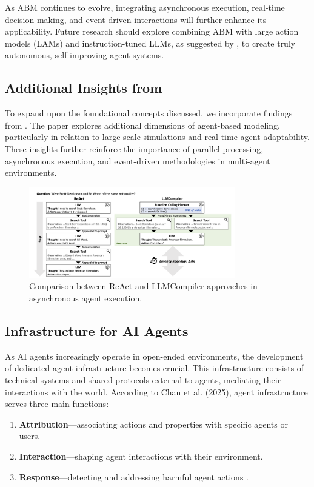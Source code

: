 As ABM continues to evolve, integrating asynchronous execution, real-time decision-making, and event-driven interactions will further enhance its applicability. Future research should explore combining ABM with large action models (LAMs) and instruction-tuned LLMs, as suggested by \cite{ginart2024}, to create truly autonomous, self-improving agent systems.

\subsection{Additional Insights from \cite{ginart2024}}

To expand upon the foundational concepts discussed, we incorporate findings from \cite{ginart2024}. The paper explores additional dimensions of agent-based modeling, particularly in relation to large-scale simulations and real-time agent adaptability. These insights further reinforce the importance of parallel processing, asynchronous execution, and event-driven methodologies in multi-agent environments.

\begin{figure}[h!]
\centering
\includegraphics[width=0.8\textwidth]{Assets/agent-architecture.png}
\caption{Comparison between ReAct and LLMCompiler approaches in asynchronous agent execution.}
\end{figure}

\newpage
\subsection{Infrastructure for AI Agents}

As AI agents increasingly operate in open-ended environments, the development of dedicated agent infrastructure becomes crucial. This infrastructure consists of technical systems and shared protocols external to agents, mediating their interactions with the world. According to Chan et al. (2025), agent infrastructure serves three main functions: 
\begin{enumerate}
    \item \textbf{Attribution}—associating actions and properties with specific agents or users.
    \item \textbf{Interaction}—shaping agent interactions with their environment.
    \item \textbf{Response}—detecting and addressing harmful agent actions \cite{chan2025}.
\end{enumerate}

